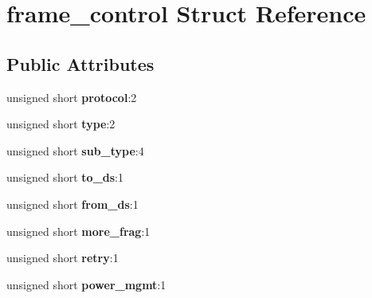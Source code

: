 \hypertarget{structframe__control}{}\section{frame\+\_\+control Struct Reference}
\label{structframe__control}
\subsection*{Public Attributes}
\begin{DoxyCompactItemize}
\item 
unsigned short {\bfseries protocol}\+:2\hypertarget{structframe__control_a75f4c8f943d360e711acf8e3fbbfbba9}{}\label{structframe__control_a75f4c8f943d360e711acf8e3fbbfbba9}

\item 
unsigned short {\bfseries type}\+:2\hypertarget{structframe__control_afb27db9aa36003679b44cdceaa00ff6a}{}\label{structframe__control_afb27db9aa36003679b44cdceaa00ff6a}

\item 
unsigned short {\bfseries sub\+\_\+type}\+:4\hypertarget{structframe__control_a0cf228b97548bbd1721073b6ce48a1fc}{}\label{structframe__control_a0cf228b97548bbd1721073b6ce48a1fc}

\item 
unsigned short {\bfseries to\+\_\+ds}\+:1\hypertarget{structframe__control_a1db4f7b27647ee5e2882b1fc82b31508}{}\label{structframe__control_a1db4f7b27647ee5e2882b1fc82b31508}

\item 
unsigned short {\bfseries from\+\_\+ds}\+:1\hypertarget{structframe__control_a2b6204224bf81f98f672e90ac9242471}{}\label{structframe__control_a2b6204224bf81f98f672e90ac9242471}

\item 
unsigned short {\bfseries more\+\_\+frag}\+:1\hypertarget{structframe__control_aab6c806b88227e9837fba037087153ac}{}\label{structframe__control_aab6c806b88227e9837fba037087153ac}

\item 
unsigned short {\bfseries retry}\+:1\hypertarget{structframe__control_a0bd8c587c2c09d7b5f88bdb8bad44a3c}{}\label{structframe__control_a0bd8c587c2c09d7b5f88bdb8bad44a3c}

\item 
unsigned short {\bfseries power\+\_\+mgmt}\+:1\hypertarget{structframe__control_a92f169e8b6d17af88fef2b2beb6380fc}{}\label{structframe__control_a92f169e8b6d17af88fef2b2beb6380fc}


\end{DoxyCompactItemize}
